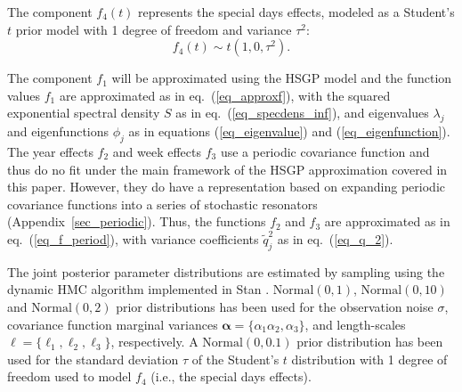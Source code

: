 The component $f_4(t)$ represents the special days effects, modeled as a Student's $t$ prior model with 1 degree of freedom and variance $\tau^2$:
%
\begin{equation*}
f_4(t) \sim t(1,0,\tau^2).
\end{equation*}
%

The component $f_1$ will be approximated using the HSGP model and the function values $f_1$ are approximated as in eq.~(\ref{eq_approxf}), with the squared exponential spectral density $S$ as in eq.~(\ref{eq_specdens_inf}), and eigenvalues $\lambda_j$ and eigenfunctions $\phi_j$ as in equations (\ref{eq_eigenvalue}) and (\ref{eq_eigenfunction}). The year effects $f_2$ and week effects $f_3$ use a periodic covariance function  and thus do no fit under the main framework of the HSGP approximation covered in this paper. However, they do have a representation based on expanding periodic covariance functions into a series of stochastic resonators (Appendix~\ref{sec_periodic}). Thus, the functions $f_2$ and $f_3$ are approximated as in eq.~(\ref{eq_f_period}), with variance coefficients $\tilde{q}_j^2$ as in eq.~(\ref{eq_q_2}).

The joint posterior parameter distributions are estimated by sampling using the dynamic HMC algorithm implemented in Stan \citep{StanTeam:2021}. $\mathrm{Normal}(0,1)$, \linebreak $\mathrm{Normal}(0,10)$ and $\mathrm{Normal}(0,2)$ prior distributions has been used for the observation noise $\sigma$, covariance function marginal variances $\bm{\alpha}=\{\alpha_1 \alpha_2, \alpha_3\}$, and length-scales $\bm{\ell}=\{\ell_1, \ell_2, \ell_3\}$, respectively. A $\mathrm{Normal}(0,0.1)$ prior distribution has been used for the standard deviation $\tau$ of the Student's $t$ distribution with 1 degree of freedom used to model $f_4$ (i.e., the special days effects).

